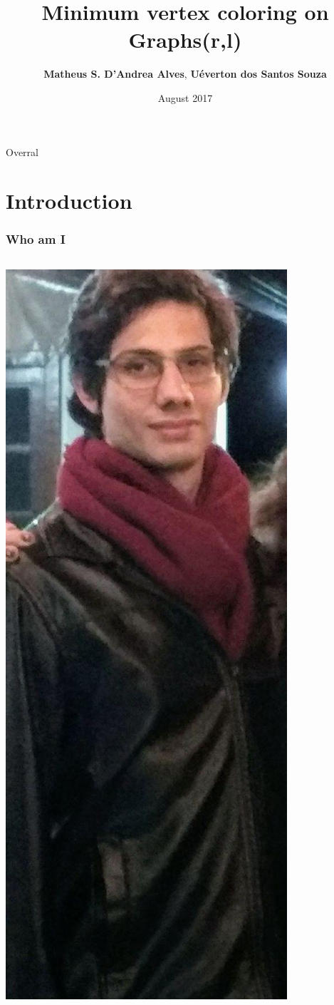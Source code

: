\documentclass[9pt, compress]{beamer}
\author{\textbf{Matheus S. D'Andrea Alves}, \textbf{Uéverton dos Santos Souza} }
\title{Minimum vertex coloring on Graphs(r,l)}
\institute{\textbf{Universidade Federal Fluminense}}
\date{August 2017}
\begin{document}
    \maketitle
    \begin{frame}{Overral}
    \centering
        \tableofcontents
    \end{frame}
    \section{Introduction}
    \begin{frame}
        \frametitle{Who am I}
        \begin{columns}
          \begin{column}{0.3\textwidth}
            \includegraphics[scale=0.2]{../figuras/foto.jpg}

\end{column}
\end{columns}
\end{frame}
\end{document}
